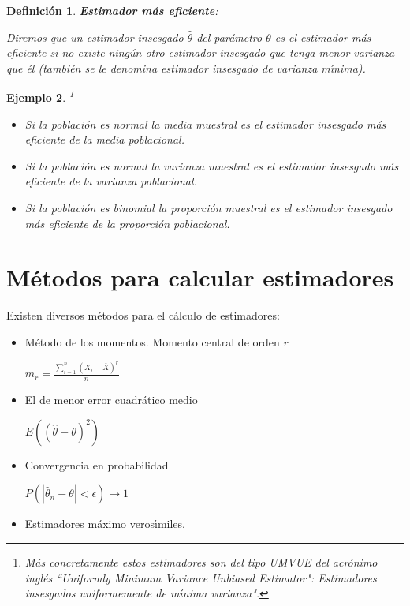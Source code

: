 \documentclass[12pt]{report}
\newtheorem{definition}{Definici\'on}
\newtheorem{example}[definition]{Ejemplo}
\begin{document}
  \begin{definition}\textbf{Estimador m\'as eficiente}:

      Diremos que un estimador insesgado $\hat{\theta}$
      del pa\-r\'a\-me\-tro $\theta$ es el estimador m\'as eficiente si no
      existe ning\'un otro estimador insesgado que tenga menor varianza
      que \'el (tambi\'en se le denomina estimador insesgado de varianza
      m\'{\i}nima).

\end{definition}
      \begin{example}\footnote{ M\'as concretamente estos estimadores son del tipo UMVUE del
      acr\'onimo ingl\'es ``Uniformly Minimum Variance Unbiased Estimator": Estimadores
      insesgados uniformemente de m\'{\i}nima varianza".}
      \begin{itemize}
       \item Si la poblaci\'on es normal la media muestral es el
       estimador insesgado m\'as eficiente de la media poblacional.
       \item Si la poblaci\'on es normal la varianza muestral es el
       estimador insesgado  m\'as eficiente de la varianza poblacional.
       \item Si la poblaci\'on es binomial la proporci\'on muestral es el
       estimador insesgado m\'as eficiente de la proporci\'on poblacional.
      \end{itemize}
      \end{example}

\section{M\'etodos para calcular estimadores}

Existen diversos m\'etodos para el c\'alculo de estimadores:

\begin{itemize}
\item M\'etodo de los momentos. Momento central de orden $r$

$m_{r}=\frac{\sum_{i=1}^{n} (X_{i}-\overline{X})^r}{n}$

\item El de menor error cuadr\'atico medio

$E((\hat{\theta}-\theta)^2)$

\item  Convergencia en probabilidad

$P(|\hat{\theta}_{n}-\theta|<\epsilon)\to 1$

\item Estimadores m\'aximo veros\'{\i}miles.
\end{itemize}
\end{document}
